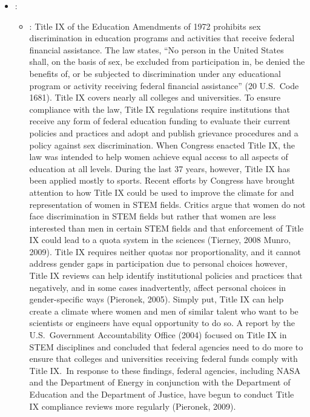 \documentclass[12pt,a4paper]{article}
\begin{document}
\begin{enumerate}
\begin{itemize}
      \item {}:\
      \begin{itemize}
        \item {}: Title IX of the Education Amendments of 1972 prohibits sex discrimination in education programs and activities that receive federal financial assistance. The law states, ``No person in the United States shall, on the basis of sex, be excluded from participation in, be denied the benefits of, or be subjected to discrimination under any educational program or activity receiving federal financial assistance'' (20 U.S.\ Code 1681). Title IX covers nearly all colleges and universities. To ensure compliance with the law, Title IX regulations require institutions that receive any form of federal education funding to evaluate their current policies and practices and adopt and publish grievance procedures and a policy against sex discrimination. When Congress enacted Title IX, the law was intended to help women achieve equal access to all aspects of education at all levels. During the last 37 years, however, Title IX has been applied mostly to sports. Recent efforts by Congress have brought attention to how Title IX could be used to improve the climate for and representation of women in STEM fields. Critics argue that women do not face discrimination in STEM fields but rather that women are less interested than men in certain STEM fields and that enforcement of Title IX could lead to a quota system in the sciences (Tierney, 2008 Munro, 2009). Title IX requires neither quotas nor proportionality, and it cannot address gender gaps in participation due to personal choices however, Title IX reviews can help identify institutional policies and practices that negatively, and in some cases inadvertently, affect personal choices in gender-specific ways (Pieronek, 2005). Simply put, Title IX can help create a climate where women and men of similar talent who want to be scientists or engineers have equal opportunity to do so. A report by the U.S.\ Government Accountability Office (2004) focused on Title IX in STEM disciplines and concluded that federal agencies need to do more to ensure that colleges and universities receiving federal funds comply with Title IX.\ In response to these findings, federal agencies, including NASA and the Department of Energy in conjunction with the Department of Education and the Department of Justice, have begun to conduct Title IX compliance reviews more regularly (Pieronek, 2009). \href{https://www.aauw.org/app/uploads/2020/03/why-so-few-research.pdf}{}

\end{itemize}
\end{itemize}
\end{enumerate}
\end{document}
